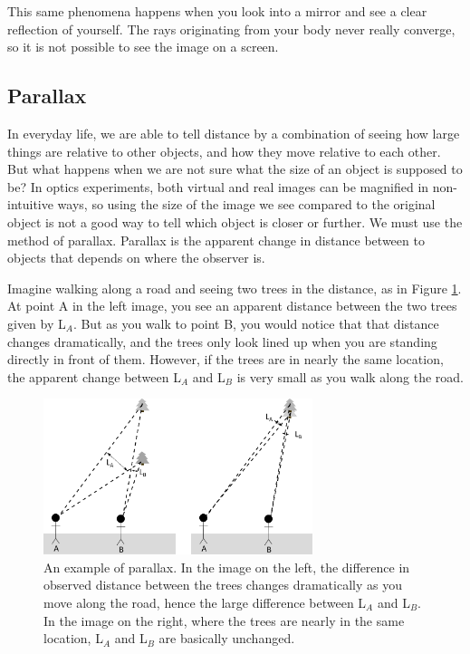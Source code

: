This same phenomena happens when you look into a mirror and see a clear reflection of yourself. The rays originating from your body never really converge, so it is not possible to see the image on a screen.

\subsection{Parallax}

In everyday life, we are able to tell distance by a combination of seeing how large things are relative to other objects, and how they move relative to each other. But what happens when we are not sure what the size of an object is supposed to be? In optics experiments, both virtual and real images can be magnified in non-intuitive ways, so using the size of the image we see compared to the original object is not a good way to tell which object is closer or further. We must use the method of parallax. Parallax is the apparent change in distance between to objects that depends on where the observer is.\myskip

Imagine walking along a road and seeing two trees in the distance, as in Figure \ref{fig:parallax}. At point A in the left image, you see an apparent distance between the two trees given by L$_A$. But as you walk to point B, you would notice that that distance changes dramatically, and the trees only look lined up when you are standing directly in front of them. However, if the trees are in nearly the same location, the apparent change between  L$_A$ and L$_B$ is very small as you walk along the road.\myskip

\begin{figure}[h]
\centering
\includegraphics[width=0.7\textwidth]{./Exp7/pic/image_parallax.png}
\caption{An example of parallax. In the image on the left, the difference in observed distance between the trees changes dramatically as you move along the road, hence the large difference between L$_A$ and L$_B$. In the image on the right, where the trees are nearly in the same location,  L$_A$ and L$_B$ are basically unchanged.}
\label{fig:parallax}
\end{figure}


